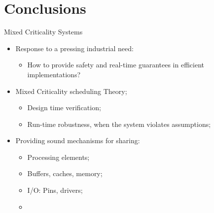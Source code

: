 \section{Conclusions}

\begin{frame}{Mixed Criticality Systems}
  
  \begin{itemize}[<+->]
  \item Response to a pressing industrial need:
  
    \begin{itemize}
    \item How to provide safety and real-time guarantees in efficient
      implementations?
    \end{itemize}
  \item Mixed Criticality scheduling Theory;
    
    \begin{itemize}
    \item Design time verification;
    \item Run-time robustness, when the system violates assumptions;
    \end{itemize}
  \item Providing sound mechanisms for sharing:
    
    \begin{itemize}
    \item Processing elements;
    \item Buffers, caches, memory;
    \item I/O: Pins, drivers;
    \item {}
    \end{itemize}
  \end{itemize}
\end{frame}


